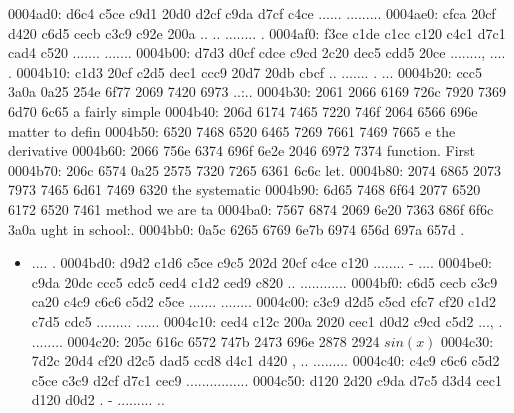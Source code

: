 \begin{bo
00010e0: 7865 647d 5c62 6567 696e 7b76 6572 6261  xed}
\begin{verba
00010f0: 7469 6d7d 0a20 2023 7479 7065 2074 6572  tim}
\begin{
0001c40: 7665 7262 6174 696d 7d0a 2020 236c 6574  verbatim}
\begin{boxe
00027a0: 647d 5c62 6567 696e 7b76 6572 6261 7469  d}
\begin{verbati
00027b0: 6d7d 0a20 2023 6c65 7420 696e 6669 7865  m}
\begin{v
0002c60: 6572 6261 7469 6d7d 0a20 2023 6c65 7420  erbatim}
\begin{
0002dc0: 7665 7262 6174 696d 7d0a 2020 236c 6574  verbatim}
\begin{boxed
0002f30: 7d5c 6265 6769 6e7b 7665 7262 6174 696d  }
\begin{verbatim
0002f40: 7d0a 2020 236c 6574 2068 6428 683a 3a74  }
\begin{v
0003e60: 6572 6261 7469 6d7d 0a20 2023 236f 7065  erbatim}
\begin{boxed
00042b0: 7d5c 6265 6769 6e7b 7665 7262 6174 696d  }
\begin{verbatim
00042c0: 7d0a 2020 2328 782c 7429 3b3b 0a20 202d  }
\begin{boxed}
0004ad0: d6c4 c5ce c9d1 20d0 d2cf c9da d7cf c4ce  ...... .........
0004ae0: cfca 20cf d420 c6d5 cecb c3c9 c92e 200a  .. .. ........ .
0004af0: f3ce c1de c1cc c120 c4c1 d7c1 cad4 c520  ....... ....... 
0004b00: d7d3 d0cf cdce c9cd 2c20 dec5 cdd5 20ce  ........, .... .
0004b10: c1d3 20cf c2d5 dec1 ccc9 20d7 20db cbcf  .. ....... . ...
0004b20: ccc5 3a0a 0a25 254e 6f77 2069 7420 6973  ..:..%
0004b30: 2061 2066 6169 726c 7920 7369 6d70 6c65   a fairly simple
0004b40: 206d 6174 7465 7220 746f 2064 6566 696e   matter to defin
0004b50: 6520 7468 6520 6465 7269 7661 7469 7665  e the derivative
0004b60: 2066 756e 6374 696f 6e2e 2046 6972 7374   function. First
0004b70: 206c 6574 0a25 2575 7320 7265 6361 6c6c   let.%
0004b80: 2074 6865 2073 7973 7465 6d61 7469 6320   the systematic 
0004b90: 6d65 7468 6f64 2077 6520 6172 6520 7461  method we are ta
0004ba0: 7567 6874 2069 6e20 7363 686f 6f6c 3a0a  ught in school:.
0004bb0: 0a5c 6265 6769 6e7b 6974 656d 697a 657d  .\begin{itemize}
0004bc0: 0a0a 2020 5c69 7465 6d20 e5d3 ccc9 20d7  ..  \item .... .
0004bd0: d9d2 c1d6 c5ce c9c5 202d 20cf c4ce c120  ........ - .... 
0004be0: c9da 20dc ccc5 cdc5 ced4 c1d2 ced9 c820  .. ............ 
0004bf0: c6d5 cecb c3c9 ca20 c4c9 c6c6 c5d2 c5ce  ....... ........
0004c00: c3c9 d2d5 c5cd cfc7 cf20 c1d2 c7d5 cdc5  ......... ......
0004c10: ced4 c12c 200a 2020 cec1 d0d2 c9cd c5d2  ..., .  ........
0004c20: 205c 616c 6572 747b 2473 696e 2878 2924   \alert{$sin(x)$
0004c30: 7d2c 20d4 cf20 d2c5 dad5 ccd8 d4c1 d420  }, .. ......... 
0004c40: c4c9 c6c6 c5d2 c5ce c3c9 d2cf d7c1 cec9  ................
0004c50: d120 2d20 c9da d7c5 d3d4 cec1 d120 d0d2  . - ......... ..

\end{itemize}
\end{boxed}
\end{verbatim
00042c0: 7d0a 2020 2328 782c 7429 3b3b 0a20 202d  }
\end{boxed
00042b0: 7d5c 6265 6769 6e7b 7665 7262 6174 696d  }
\end{v
0003e60: 6572 6261 7469 6d7d 0a20 2023 236f 7065  erbatim}
\end{verbatim
0002f40: 7d0a 2020 236c 6574 2068 6428 683a 3a74  }
\end{boxed
0002f30: 7d5c 6265 6769 6e7b 7665 7262 6174 696d  }
\end{
0002dc0: 7665 7262 6174 696d 7d0a 2020 236c 6574  verbatim}
\end{v
0002c60: 6572 6261 7469 6d7d 0a20 2023 6c65 7420  erbatim}
\end{verbati
00027b0: 6d7d 0a20 2023 6c65 7420 696e 6669 7865  m}
\end{boxe
00027a0: 647d 5c62 6567 696e 7b76 6572 6261 7469  d}
\end{
0001c40: 7665 7262 6174 696d 7d0a 2020 236c 6574  verbatim}
\end{verba
00010f0: 7469 6d7d 0a20 2023 7479 7065 2074 6572  tim}
\end{bo
00010e0: 7865 647d 5c62 6567 696e 7b76 6572 6261  xed}
